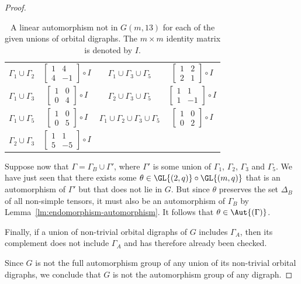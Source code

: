 \begin{proof}
\begin{table}
\begin{tabular}{cc||cc}
\vphantom{\Bigg(} $\Gamma_1 \cup \Gamma_2$ & $\begin{bmatrix} 1 & 4 \\ 4 & -1 \end{bmatrix} \circ I$ & $\Gamma_1 \cup \Gamma_3 \cup \Gamma_5$ & $\begin{bmatrix} 1 & 2 \\ 2 & 1 \end{bmatrix} \circ I$ \\
\vphantom{\Bigg(} $\Gamma_1 \cup \Gamma_3$ & $\begin{bmatrix} 1 & 0 \\ 0 & 4 \end{bmatrix} \circ I$ & $\Gamma_2 \cup \Gamma_3 \cup \Gamma_5$ & $\begin{bmatrix} 1 & 1 \\ 1 & -1 \end{bmatrix} \circ I$ \\
\vphantom{\Bigg(} $\Gamma_1 \cup \Gamma_5$ & $\begin{bmatrix} 1 & 0 \\ 0 & 5 \end{bmatrix} \circ I$ & $\Gamma_1 \cup \Gamma_2 \cup \Gamma_3 \cup \Gamma_5$ & $\begin{bmatrix} 1 & 0 \\ 0 & 2 \end{bmatrix} \circ I$ \\
\vphantom{\Bigg(} $\Gamma_2 \cup \Gamma_3$ & $\begin{bmatrix} 1 & 1 \\ 5 & -5 \end{bmatrix} \circ I$ \\
\hline
\end{tabular}
\caption{A linear automorphism not in $G{\left(m, 13 \right)}$ for each of the given unions of orbital digraphs. The $m \times m$ identity matrix is denoted by $I$.}
\label{tbl:q=13,endomorphisms}
\end{table}

Suppose now that $\Gamma = \Gamma_B \cup \Gamma'$, where $\Gamma'$ is some union of $\Gamma_1$, $\Gamma_2$, $\Gamma_3$ and $\Gamma_5$. We have just seen that there exists some $\theta \in \GL{\left(2, q \right)} \circ \GL{\left(m, q \right)}$ that is an automorphism of $\Gamma'$ but that does not lie in $G$. But since $\theta$ preserves the set $\Delta_B$ of all non-simple tensors, it must also be an automorphism of $\Gamma_B$ by Lemma~\ref{lm:endomorphism-automorphism}. It follows that $\theta \in \Aut{\left(\Gamma \right)}$.

Finally, if a union of non-trivial orbital digraphs of $G$ includes $\Gamma_A$, then its complement does not include $\Gamma_A$ and has therefore already been checked.

Since $G$ is not the full automorphism group of any union of its non-trivial orbital digraphs, we conclude that $G$ is not the automorphism group of any digraph.
\end{proof}

